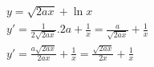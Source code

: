 \begin{ex}
\begin{align}
&y=\sqrt{2ax}+\ln{x}\nonumber\\
&y'=\frac{1}{2\sqrt{2ax}}.2a+\frac{1}{x}=\frac{a}{\sqrt{2ax}}+\frac{1}{x}\nonumber\\
&y'=\frac{a\sqrt{2ax}}{2ax}+\frac{1}{x}=\frac{\sqrt{2ax}}{2x}+\frac{1}{x}\nonumber
\end{align}
\end{ex}